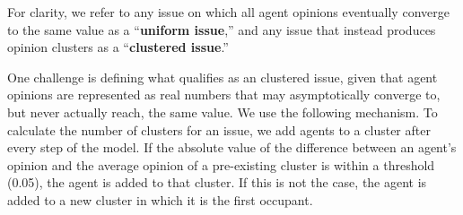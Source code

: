 For clarity, we refer to any issue on which all agent opinions eventually
converge to the same value as a ``\textbf{uniform issue},'' and any issue that
instead produces opinion clusters as a ``\textbf{clustered issue}.''

One challenge is defining what qualifies as an clustered issue, given that
agent opinions are represented as real numbers that may asymptotically converge
to, but never actually reach, the same value. We use the following mechanism.
To calculate the number of clusters for an issue, we add agents to a cluster
after every step of the model. If the absolute value of the difference between
an agent's opinion and the average opinion of a pre-existing cluster is within
a threshold (0.05), the agent is added to that cluster. If this is not the
case, the agent is added to a new cluster in which it is the first occupant.

